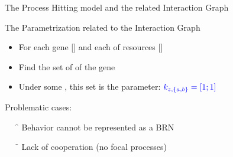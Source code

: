 \begin{frame}
\begin{columns}
\begin{column}{0.25\textwidth}
\end{column}
\end{columns}

\bigskip
{} The Process Hitting model and the related Interaction Graph

 The Parametrization related to the Interaction Graph

\medskip

\pause[2]
\begin{itemize}
  \item For each gene [] and each  of resources []
\pause[3]
  \item Find the set of  of the gene\pause[4] [\ex{$\{z_1\}$}]
\pause[5]
  \item Under some , this set is the parameter: $\ex{k_{z,\{a,b\}} = [1;1]}$
\end{itemize}

\pause[6]
Problematic cases:
\begin{itemize}
  \item[\f] Behavior cannot be represented as a BRN
  \item[\f] Lack of cooperation (no focal processes)
\end{itemize}
\end{frame}



